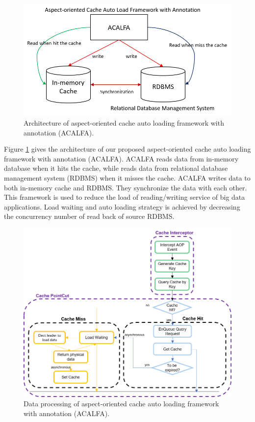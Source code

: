 \documentclass{singlecol-new}
\theoremstyle{TH}{
\newtheorem{lemma}{Lemma}
\newtheorem{theorem}[lemma]{Theorem}
\newtheorem{corrolary}[lemma]{Corrolary}
\newtheorem{conjecture}[lemma]{Conjecture}
\newtheorem{proposition}[lemma]{Proposition}
\newtheorem{claim}[lemma]{Claim}
\newtheorem{stheorem}[lemma]{Wrong Theorem}
}
\theoremstyle{THrm}{
\newtheorem{definition}{Definition}[section]
\newtheorem{question}{Question}[section]
\newtheorem{remark}{Remark}
\newtheorem{scheme}{Scheme}
}
\theoremstyle{THhit}{
\newtheorem{case}{Case}[section]
}
\begin{document}
\begin{figure} [htb]
\centering
\includegraphics[width=1.0\linewidth]{img/architecture}
\caption{\label{architecture}Architecture of aspect-oriented cache auto loading framework with annotation (ACALFA).}
\end{figure}

Figure \ref{architecture} gives the architecture of our proposed aspect-oriented cache auto loading framework with annotation (ACALFA). ACALFA reads data from in-memory database when it hits the cache, while reads data from relational database management system (RDBMS) when it misses the cache. ACALFA writes data to both in-memory cache and RDBMS. They synchronize the data with each other. This framework is used to reduce the load of reading/writing service of big data applications. Load waiting and auto loading strategy is achieved by decreasing the concurrency number of read back of source RDBMS.

\begin{figure} [htb]
\centering
\includegraphics[width=1.0\linewidth]{img/process}
\caption{\label{process}Data processing of aspect-oriented cache auto loading framework with annotation (ACALFA).}
\end{figure}
\end{document}
